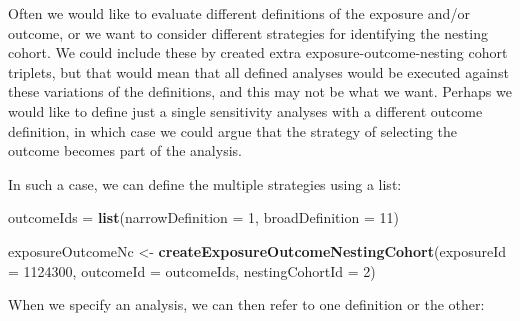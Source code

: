 \documentclass[]{article}
\newenvironment{Shaded}{\begin{snugshade}}{\end{snugshade}}
\newcommand{\DataTypeTok}[1]{\textcolor[rgb]{0.13,0.29,0.53}{#1}}
\newcommand{\DecValTok}[1]{\textcolor[rgb]{0.00,0.00,0.81}{#1}}
\newcommand{\KeywordTok}[1]{\textcolor[rgb]{0.13,0.29,0.53}{\textbf{#1}}}
\newcommand{\NormalTok}[1]{#1}
\newcommand{\StringTok}[1]{\textcolor[rgb]{0.31,0.60,0.02}{#1}}
\begin{document}
Often we would like to evaluate different definitions of the exposure
and/or outcome, or we want to consider different strategies for
identifying the nesting cohort. We could include these by created extra
exposure-outcome-nesting cohort triplets, but that would mean that all
defined analyses would be executed against these variations of the
definitions, and this may not be what we want. Perhaps we would like to
define just a single sensitivity analyses with a different outcome
definition, in which case we could argue that the strategy of selecting
the outcome becomes part of the analysis.

In such a case, we can define the multiple strategies using a list:

\begin{Shaded}
\begin{Highlighting}[]
\NormalTok{outcomeIds =}\StringTok{ }\KeywordTok{list}\NormalTok{(}\DataTypeTok{narrowDefinition =} \DecValTok{1}\NormalTok{,}
                  \DataTypeTok{broadDefinition =} \DecValTok{11}\NormalTok{)}

\NormalTok{exposureOutcomeNc <-}\StringTok{ }\KeywordTok{createExposureOutcomeNestingCohort}\NormalTok{(}\DataTypeTok{exposureId =} \DecValTok{1124300}\NormalTok{,}
                                                        \DataTypeTok{outcomeId =}\NormalTok{ outcomeIds,}
                                                        \DataTypeTok{nestingCohortId =} \DecValTok{2}\NormalTok{)}
\end{Highlighting}
\end{Shaded}

When we specify an analysis, we can then refer to one definition or the
other:
\end{document}
